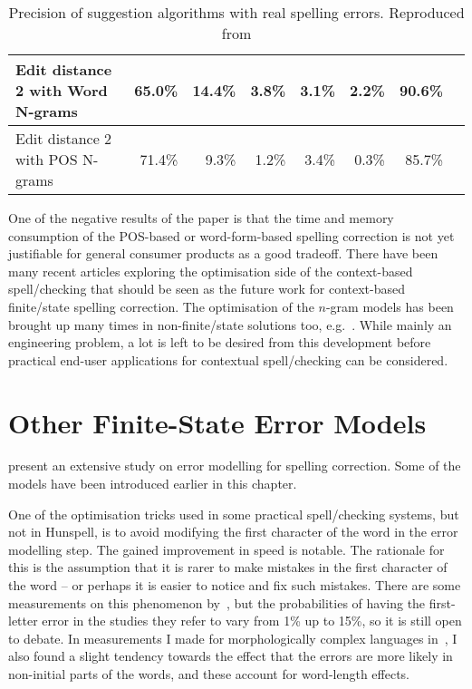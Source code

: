 \documentclass[officiallayout,final]{unihelcompling}
\begin{document}
\begin{table}
\begin{tabular}{lrrrrrrr}
        \hline
        Edit distance 2 with Word N-grams
& 65.0\% & 14.4\% & 3.8\% & 3.1\% & 2.2\% & 90.6\% \\
        \hline
        Edit distance 2 with POS N-grams
& 71.4\% & 9.3\% & 1.2\% & 3.4\% & 0.3\% & 85.7\% \\
        \hline
    \end{tabular}
  \caption{Precision of suggestion algorithms with real spelling errors.
      Reproduced from 
  \label{table:repro-2012-cicling}}
\end{table}

One of the negative results of the paper is that the time and memory
consumption of the POS-based or word-form-based spelling correction is not yet
justifiable for general consumer products as a good tradeoff. There have been
many recent articles exploring the optimisation side of the context-based
spell\-/checking that should be seen as the future work for context-based
finite\-/state spelling correction. The optimisation of the \(n\)-gram models
has been brought up many times in non-finite\-/state solutions too,
e.g.~\citet{church2007compressing}. While mainly an engineering problem, a lot
is left to be desired from this development before practical end-user
applications for contextual spell\-/checking can be considered.

\section{Other Finite-State Error Models}
\label{sec:other-errors}

\citet{deorowicz2005correcting} present an extensive study on error
modelling for spelling correction. Some of the models have been
introduced earlier in this chapter.

One of the optimisation tricks used in some practical spell\-/checking systems,
but not in Hunspell, is to avoid modifying the first character of the word in
the error modelling step. The gained improvement in speed is notable. The
rationale for this is the assumption that it is rarer to make mistakes in the
first character of the word -- or perhaps it is easier to notice and fix such
mistakes. There are some measurements on this phenomenon
by~\citet{bhagat2007spelling}, but the probabilities of having the first-letter
error in the studies they refer to vary from 1\% up to 15\%, so it is still
open to debate. In measurements I made for morphologically complex languages
in~, I also found a slight tendency towards
the effect that the errors are more likely in non-initial parts of the words,
and these account for word-length effects.
\end{document}
